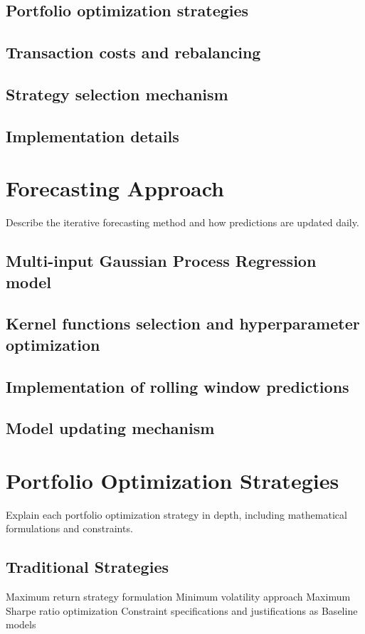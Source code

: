 \subsection{Portfolio optimization strategies}
\subsection{Transaction costs and rebalancing}
\subsection{Strategy selection mechanism}
\subsection{Implementation details}

\section{Forecasting Approach}
Describe the iterative forecasting method and how predictions are updated daily.
\subsection{Multi-input Gaussian Process Regression model}
\subsection{Kernel functions selection and hyperparameter optimization}
\subsection{Implementation of rolling window predictions}
\subsection{Model updating mechanism}

\section{Portfolio Optimization Strategies}
Explain each portfolio optimization strategy in depth, including mathematical formulations and constraints.
\subsection{Traditional Strategies}
Maximum return strategy formulation
Minimum volatility approach
Maximum Sharpe ratio optimization
Constraint specifications and justifications as Baseline models
